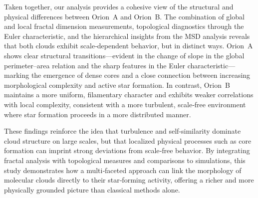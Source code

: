 Taken together, our analysis provides a cohesive view of the structural and physical differences between Orion~A and Orion~B.  
The combination of global and local fractal dimension measurements, topological diagnostics through the Euler characteristic, and the hierarchical insights from the MSD analysis reveals that both clouds exhibit scale‑dependent behavior, but in distinct ways.  
Orion~A shows clear structural transitions—evident in the change of slope in the global perimeter–area relation and the sharp features in the Euler characteristic—marking the emergence of dense cores and a close connection between increasing morphological complexity and active star formation.  
In contrast, Orion~B maintains a more uniform, filamentary character and exhibits weaker correlations with local complexity, consistent with a more turbulent, scale‑free environment where star formation proceeds in a more distributed manner.  

These findings reinforce the idea that turbulence and self‑similarity dominate cloud structure on large scales, but that localized physical processes such as core formation can imprint strong deviations from scale‑free behavior.  
By integrating fractal analysis with topological measures and comparisons to simulations, this study demonstrates how a multi‑faceted approach can link the morphology of molecular clouds directly to their star‑forming activity, offering a richer and more physically grounded picture than classical methods alone.

